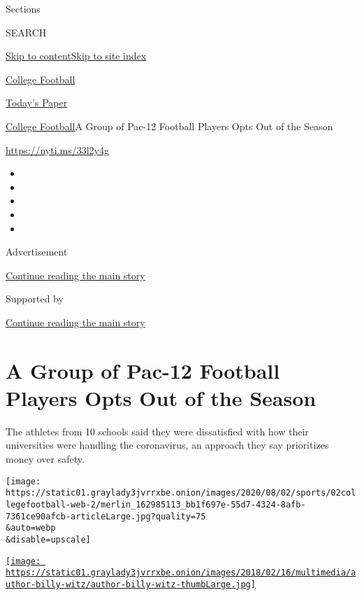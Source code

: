 Sections

SEARCH

\protect\hyperlink{site-content}{Skip to
content}\protect\hyperlink{site-index}{Skip to site index}

\href{https://www.nytimes3xbfgragh.onion/section/sports/ncaafootball}{College
Football}

\href{https://myaccount.nytimes3xbfgragh.onion/auth/login?response_type=cookie\&client_id=vi}{}

\href{https://www.nytimes3xbfgragh.onion/section/todayspaper}{Today's
Paper}

\href{/section/sports/ncaafootball}{College Football}\textbar{}A Group
of Pac-12 Football Players Opts Out of the Season

\url{https://nyti.ms/33l2y4g}

\begin{itemize}
\item
\item
\item
\item
\item
\end{itemize}

Advertisement

\protect\hyperlink{after-top}{Continue reading the main story}

Supported by

\protect\hyperlink{after-sponsor}{Continue reading the main story}

\hypertarget{a-group-of-pac-12-football-players-opts-out-of-the-season}{%
\section{A Group of Pac-12 Football Players Opts Out of the
Season}\label{a-group-of-pac-12-football-players-opts-out-of-the-season}}

The athletes from 10 schools said they were dissatisfied with how their
universities were handling the coronavirus, an approach they say
prioritizes money over safety.

\texttt{[image: https://static01.graylady3jvrrxbe.onion/images/2020/08/02/sports/02collegefootball-web-2/merlin\_162985113\_bb1f697e-55d7-4324-8afb-7361ce90afcb-articleLarge.jpg?quality=75\\\&auto=webp\\\&disable=upscale]}

\href{https://www.nytimes3xbfgragh.onion/by/billy-witz}{\texttt{[image: https://static01.graylady3jvrrxbe.onion/images/2018/02/16/multimedia/author-billy-witz/author-billy-witz-thumbLarge.jpg]}}


